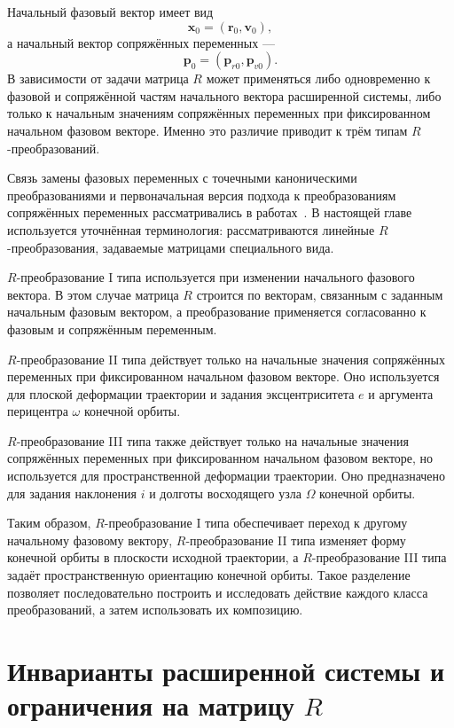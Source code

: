 Начальный фазовый вектор имеет вид
\begin{equation}
\mathbf x_0=(\mathbf r_0,\mathbf v_0),
\end{equation}
а начальный вектор сопряжённых переменных ---
\begin{equation}
\mathbf p_0=(\mathbf p_{r0},\mathbf p_{v0}).
\end{equation}
В зависимости от задачи матрица \(R\) может применяться либо одновременно к фазовой и сопряжённой частям начального вектора расширенной системы, либо только к начальным значениям сопряжённых переменных при фиксированном начальном фазовом векторе. Именно это различие приводит к трём типам \(R\)-преобразований.

Связь замены фазовых переменных с точечными каноническими преобразованиями и первоначальная версия подхода к преобразованиям сопряжённых переменных рассматривались в работах~\cite{korneev_phase_variables_2021,korneev_affine_transformations_2025}. В настоящей главе используется уточнённая терминология: рассматриваются линейные \(R\)-преобразования, задаваемые матрицами специального вида.

\(R\)-преобразование I типа используется при изменении начального фазового вектора. В этом случае матрица \(R\) строится по векторам, связанным с заданным начальным фазовым вектором, а преобразование применяется согласованно к фазовым и сопряжённым переменным.

\(R\)-преобразование II типа действует только на начальные значения сопряжённых переменных при фиксированном начальном фазовом векторе. Оно используется для плоской деформации траектории и задания эксцентриситета \(e\) и аргумента перицентра \(\omega\) конечной орбиты.

\(R\)-преобразование III типа также действует только на начальные значения сопряжённых переменных при фиксированном начальном фазовом векторе, но используется для пространственной деформации траектории. Оно предназначено для задания наклонения \(i\) и долготы восходящего узла \(\Omega\) конечной орбиты.

Таким образом, \(R\)-преобразование I типа обеспечивает переход к другому начальному фазовому вектору, \(R\)-преобразование II типа изменяет форму конечной орбиты в плоскости исходной траектории, а \(R\)-преобразование III типа задаёт пространственную ориентацию конечной орбиты. Такое разделение позволяет последовательно построить и исследовать действие каждого класса преобразований, а затем использовать их композицию.

\section{Инварианты расширенной системы и ограничения на матрицу \(R\)}

